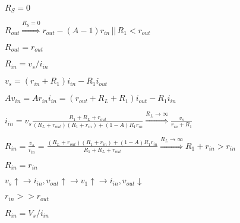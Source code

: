 \documentclass{article}
\def\lthtmlcheckvsize{\ifdim\ht\sizebox<\vsize 
  \ifdim\wd\sizebox<\hsize\expandafter\hfill\fi \expandafter\vfill
  \else\expandafter\vss\fi}%
\begin{document}
{\newpage\clearpage
{}%
$ R_S=0$%
\lthtmlindisplaymathZ
\lthtmlcheckvsize\clearpage}

{\newpage\clearpage
{}%
$\displaystyle R_{out}\stackrel{R_S=0}{\Longrightarrow} r_{out}-(A-1) r_{in}\,||\,R_1 < r_{out}$%
\lthtmlindisplaymathZ
\lthtmlcheckvsize\clearpage}

{\newpage\clearpage
{}%
$ R_{out}=r_{out}$%
\lthtmlindisplaymathZ
\lthtmlcheckvsize\clearpage}

{\newpage\clearpage
{}%
$ R_{in}=v_s/i_{in}$%
\lthtmlindisplaymathZ
\lthtmlcheckvsize\clearpage}

{\newpage\clearpage
{}%
$\displaystyle v_s=(r_{in}+R_1) i_{in}-R_1 i_{out}$%
\lthtmlindisplaymathZ
\lthtmlcheckvsize\clearpage}

{\newpage\clearpage
{}%
$\displaystyle A v_{in}=Ar_{in}i_{in}=(r_{out}+R_L+R_1)i_{out}-R_1i_{in}$%
\lthtmlindisplaymathZ
\lthtmlcheckvsize\clearpage}

{\newpage\clearpage
{}%
$\displaystyle i_{in}=v_s \frac{R_1+R_L+r_{out}}{(R_L+r_{out})(R_1+r_{in})+(1-A)R_1r_{in}}
\stackrel{R_L\rightarrow \infty}{\Longrightarrow} \frac{v_s}{r_{in}+R_1}$%
\lthtmlindisplaymathZ
\lthtmlcheckvsize\clearpage}

{\newpage\clearpage
{}%
$\displaystyle R_{in}=\frac{v_s}{i_{in}}=\frac{(R_L+r_{out})(R_1+r_{in})+(1-A)R_1r_{in}}{R_1+R_L+r_{out}}
\stackrel{R_L\rightarrow \infty}{\Longrightarrow} R_1+r_{in}>r_{in}$%
\lthtmlindisplaymathZ
\lthtmlcheckvsize\clearpage}

{\newpage\clearpage
{}%
$ R_{in}=r_{in}$%
\lthtmlindisplaymathZ
\lthtmlcheckvsize\clearpage}

{\newpage\clearpage
{}%
$\displaystyle v_s\uparrow \rightarrow i_{in}, v_{out}\uparrow \rightarrow v_1\uparrow
\rightarrow i_{in}, v_{out}\downarrow$%
\lthtmlindisplaymathZ
\lthtmlcheckvsize\clearpage}

{\newpage\clearpage
{}%
$ r_{in}>>r_{out}$%
\lthtmlindisplaymathZ
\lthtmlcheckvsize\clearpage}

{\newpage\clearpage
{}%
$ R_{in}=V_s/i_{in}$%
\lthtmlindisplaymathZ
\lthtmlcheckvsize\clearpage}
\end{document}
